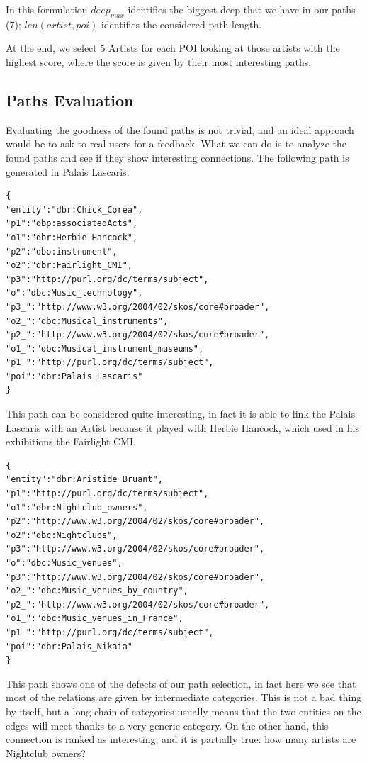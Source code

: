 \documentclass[paper=a4, fontsize=11pt]{scrartcl}
\begin{document}
In this formulation $deep_{max}$ identifies the biggest deep that we have in our paths (7); $len(artist,poi)$ identifies the considered path length.

At the end, we select 5 Artists for each POI looking at those artists with the highest score, where the score is given by their most interesting paths.

\subsection{Paths Evaluation}
Evaluating the goodness of the found paths is not trivial, and an ideal approach would be to ask to real users for a feedback.
What we can do is to analyze the found paths and see if they show interesting connections.
The following path is generated in Palais Lascaris:
\begin{lstlisting}
{
"entity":"dbr:Chick_Corea",
"p1":"dbp:associatedActs", 
"o1":"dbr:Herbie_Hancock", 
"p2":"dbo:instrument", 
"o2":"dbr:Fairlight_CMI", 
"p3":"http://purl.org/dc/terms/subject", 
"o":"dbc:Music_technology", 
"p3_":"http://www.w3.org/2004/02/skos/core#broader", 
"o2_":"dbc:Musical_instruments", 
"p2_":"http://www.w3.org/2004/02/skos/core#broader",       
"o1_":"dbc:Musical_instrument_museums", 
"p1_":"http://purl.org/dc/terms/subject", 
"poi":"dbr:Palais_Lascaris"
}
\end{lstlisting}
This path can be considered quite interesting, in fact it is able to link the Palais Lascaris with an Artist because it played with Herbie Hancock, which used in his exhibitions the Fairlight CMI.
\begin{lstlisting}
{
"entity":"dbr:Aristide_Bruant", 
"p1":"http://purl.org/dc/terms/subject", 
"o1":"dbr:Nightclub_owners", 
"p2":"http://www.w3.org/2004/02/skos/core#broader", 
"o2":"dbc:Nightclubs", 
"p3":"http://www.w3.org/2004/02/skos/core#broader", 
"o":"dbc:Music_venues", 
"p3":"http://www.w3.org/2004/02/skos/core#broader", 
"o2_":"dbc:Music_venues_by_country", 
"p2_":"http://www.w3.org/2004/02/skos/core#broader", 
"o1_":"dbc:Music_venues_in_France", 
"p1_":"http://purl.org/dc/terms/subject", 
"poi":"dbr:Palais_Nikaia"
}
\end{lstlisting}
This path shows one of the defects of our path selection, in fact here we see that most of the relations are given by intermediate categories. This is not a bad thing by itself, but a long chain of categories usually means that the two entities on the edges will meet thanks to a very generic category. On the other hand, this connection is ranked as interesting, and it is partially true: how many artists are Nightclub owners?
\end{document}
